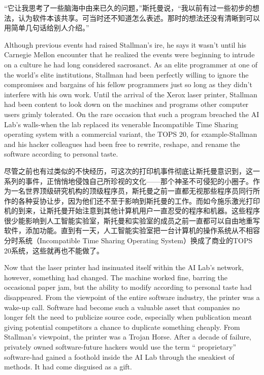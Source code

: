 \ifdefined\chs
``它让我思考了一些脑海中由来已久的问题，''斯托曼说，``我以前有过一些初步的想法，认为软件本该共享。可当时还不知道怎么表述。那时的想法还没有清晰到可以用简单几句话给别人介绍。''
\fi

\ifdefined\eng
Although previous events had raised Stallman's ire, he says it wasn't until his
Carnegie Mellon encounter that he realized the events were beginning to intrude
on a culture he had long considered sacrosanct. As an elite programmer at one of
the world's elite institutions, Stallman had been perfectly willing to ignore
the compromises and bargains of his fellow programmers just so long as they
didn't interfere with his own work. Until the arrival of the Xerox laser
printer, Stallman had been content to look down on the machines and programs
other computer users grimly tolerated. On the rare occasion that such a program
breached the AI Lab's walls-when the lab replaced its venerable Incompatible
Time Sharing operating system with a commercial variant, the TOPS 20, for
example-Stallman and his hacker colleagues had been free to rewrite, reshape,
and rename the software according to personal taste.
\fi

\ifdefined\chs
尽管之前也有过类似的不快经历，可这次的打印机事件彻底让斯托曼意识到，这一系列的事件，正悄悄地侵蚀自己所珍视的文化——那个神圣不可侵犯的小圈子。作为一名世界顶级研究机构的顶级程序员，斯托曼之前一直都无视那些程序员同行所作的各种妥协让步，因为他们还不至于影响到斯托曼的工作。而如今施乐激光打印机的到来，让斯托曼开始注意到其他计算机用户一直忍受的程序和机器。这些程序很少能影响到人工智能实验室，斯托曼和实验室的成员之前一直都可以自由地重写软件，添加功能。直到有一天，人工智能实验室把一台计算机的操作系统从不相容分时系统（Incompatible Time Sharing Operating System）换成了商业的TOPS 20系统，这些就再也不能做了。
\fi

\ifdefined\eng
Now that the laser printer had insinuated itself within the AI Lab's network,
however, something had changed. The machine worked fine, barring the occasional
paper jam, but the ability to modify according to personal taste had
disappeared. From the viewpoint of the entire software industry, the printer was
a wake-up call. Software had become such a valuable asset that companies no
longer felt the need to publicize source code, especially when publication meant
giving potential competitors a chance to duplicate something cheaply. From
Stallman's viewpoint, the printer was a Trojan Horse. After a decade of failure,
privately owned software-future hackers would use the term `` proprietary''
software-had gained a foothold inside the AI Lab through the sneakiest of
methods. It had come disguised as a gift.
\fi

